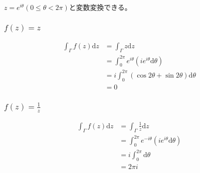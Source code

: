 \documentclass[dvipdfmx,a4paper]{jsarticle}
\begin{document}
\subsection{}
$z = e^{i\theta}(0 \leq \theta < 2\pi)$と変数変換できる。

\subsubsection{$f(z) = z$}
\begin{align*}
\int_\Gamma f(z) \mathrm d z &= \int_\Gamma z \mathrm d z\\
&= \int_0^{2\pi} e^{i\theta}(ie^{i\theta}\mathrm d\theta)\\
&= i\int_0^{2\pi} (\cos{2\theta} + \sin{2\theta})\mathrm d\theta\\
&= 0
\end{align*}

\subsubsection{$f(z) = \frac{1}{z}$}
\begin{align*}
\int_\Gamma f(z) \mathrm d z &= \int_\Gamma \frac{1}{z} \mathrm d z\\
&= \int_0^{2\pi} e^{-i\theta}(ie^{i\theta}\mathrm d\theta)\\
&= i\int_0^{2\pi}\mathrm d\theta\\
&= 2\pi i
\end{align*}
\end{document}
